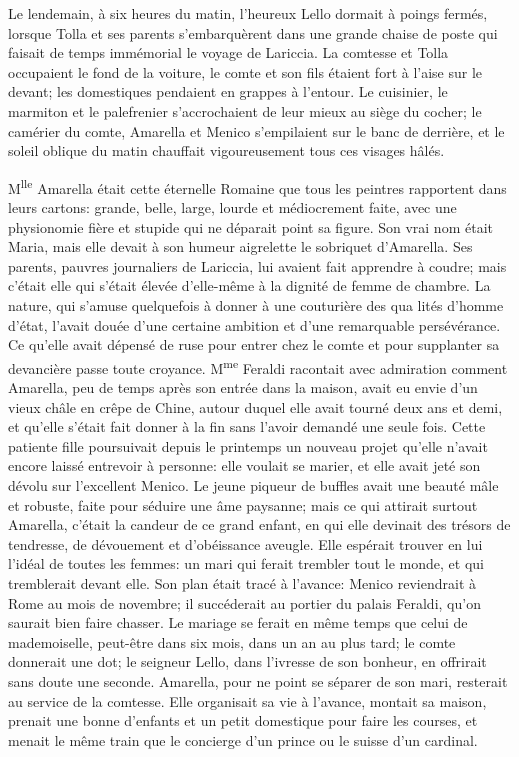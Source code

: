 
Le lendemain, à six heures du matin, l'heureux Lello dormait à poings
fermés, lorsque Tolla et ses parents s'embarquèrent dans une grande
chaise de poste qui faisait de temps immémorial le voyage de Lariccia.
La comtesse et Tolla occupaient le fond de la voiture, le comte et son
fils étaient fort à l'aise sur le devant; les domestiques pendaient en
grappes à l'entour. Le cuisinier, le marmiton et le palefrenier
s'accrochaient de leur mieux au siège du cocher; le camérier du comte,
Amarella et Menico s'empilaient sur le banc de derrière, et le soleil
oblique du matin chauffait vigoureusement tous ces visages hâlés.

M\textsuperscript{lle} Amarella était cette éternelle Romaine que tous
les peintres rapportent dans leurs cartons: grande, belle, large, lourde
et médiocrement faite, avec une physionomie fière et stupide qui ne
déparait point sa figure. Son vrai nom était Maria, mais elle devait à
son humeur aigrelette le sobriquet d'Amarella. Ses parents, pauvres
journaliers de Lariccia, lui avaient fait apprendre à coudre; mais
c'était elle qui s'était élevée d'elle-même à la dignité de femme de
chambre. La nature, qui s'amuse quelquefois à donner à une couturière
des qua lités d'homme d'état, l'avait douée d'une certaine ambition et
d'une remarquable persévérance. Ce qu'elle avait dépensé de ruse pour
entrer chez le comte et pour supplanter sa devancière passe toute
croyance. M\textsuperscript{me} Feraldi racontait avec admiration
comment Amarella, peu de temps après son entrée dans la maison, avait eu
envie d'un vieux châle en crêpe de Chine, autour duquel elle avait
tourné deux ans et demi, et qu'elle s'était fait donner à la fin sans
l'avoir demandé une seule fois. Cette patiente fille poursuivait depuis
le printemps un nouveau projet qu'elle n'avait encore laissé entrevoir à
personne: elle voulait se marier, et elle avait jeté son dévolu sur
l'excellent Menico. Le jeune piqueur de buffles avait une beauté mâle et
robuste, faite pour séduire une âme paysanne; mais ce qui attirait
surtout Amarella, c'était la candeur de ce grand enfant, en qui elle
devinait des trésors de tendresse, de dévouement et d'obéissance
aveugle. Elle espérait trouver en lui l'idéal de toutes les femmes: un
mari qui ferait trembler tout le monde, et qui tremblerait devant elle.
Son plan était tracé à l'avance: Menico reviendrait à Rome au mois de
novembre; il succéderait au portier du palais Feraldi, qu'on saurait
bien faire chasser. Le mariage se ferait en même temps que celui de
mademoiselle, peut-être dans six mois, dans un an au plus tard; le comte
donnerait une dot; le seigneur Lello, dans l'ivresse de son bonheur, en
offrirait sans doute une seconde. Amarella, pour ne point se séparer de
son mari, resterait au service de la comtesse. Elle organisait sa vie à
l'avance, montait sa maison, prenait une bonne d'enfants et un petit
domestique pour faire les courses, et menait le même train que le
concierge d'un prince ou le suisse d'un cardinal.

